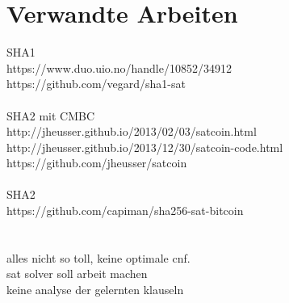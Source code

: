 \section{Verwandte Arbeiten}

SHA1\\
https://www.duo.uio.no/handle/10852/34912 \cite{vegard:1}\\
https://github.com/vegard/sha1-sat \cite{vegard:2}\\
~\\
SHA2 mit CMBC\\
http://jheusser.github.io/2013/02/03/satcoin.html \cite{jona:1}\\
http://jheusser.github.io/2013/12/30/satcoin-code.html \cite{jona:2}\\
https://github.com/jheusser/satcoin \cite{jona:3}\\
~\\
SHA2\\
https://github.com/capiman/sha256-sat-bitcoin \cite{capiman}\\
~\\
~\\
alles nicht so toll, keine optimale cnf.\\
sat solver soll arbeit machen\\
keine analyse der gelernten klauseln

